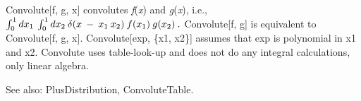 


Convolute[f, g, x] convolutes {\itshape f}({\itshape x}) and {\itshape g}({\itshape x}), i.e., \(\int _{0}^{1}{{dx}_1}\> \int _{0}^{1}{{dx}_2}\>
\delta (x\> -\> {x_1}\> {x_2})\> f({x_1})\> 
      g({x_2})\> .\) Convolute[f, g] is equivalent to Convolute[f, g, x]. Convolute[exp, \{x1, x2\}] assumes that exp is polynomial in x1 and
x2. Convolute
  uses table-look-up and does not do any integral calculations, only linear algebra.



See also:  PlusDistribution, ConvoluteTable.
















